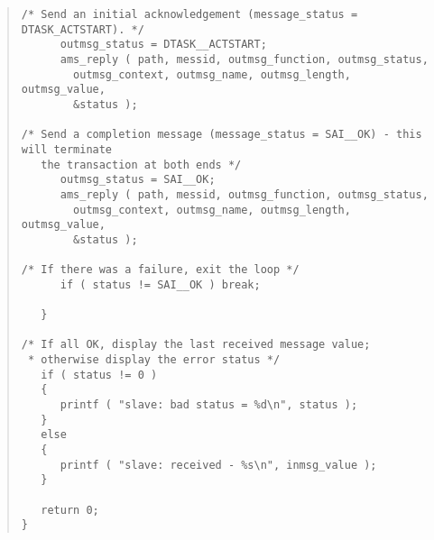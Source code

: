 \documentclass[twoside,11pt]{article}
\renewcommand{\_}{\texttt{\symbol{95}}}
\begin{document}
\begin{small}
\begin{quote}
\begin{verbatim}
/* Send an initial acknowledgement (message_status = DTASK_ACTSTART). */
      outmsg_status = DTASK__ACTSTART;
      ams_reply ( path, messid, outmsg_function, outmsg_status,
        outmsg_context, outmsg_name, outmsg_length, outmsg_value,
        &status );

/* Send a completion message (message_status = SAI__OK) - this will terminate
   the transaction at both ends */
      outmsg_status = SAI__OK;
      ams_reply ( path, messid, outmsg_function, outmsg_status,
        outmsg_context, outmsg_name, outmsg_length, outmsg_value,
        &status );

/* If there was a failure, exit the loop */
      if ( status != SAI__OK ) break;

   }

/* If all OK, display the last received message value;
 * otherwise display the error status */
   if ( status != 0 )
   {
      printf ( "slave: bad status = %d\n", status );
   }
   else
   {
      printf ( "slave: received - %s\n", inmsg_value );
   }

   return 0;
}
\end{verbatim}
\end{quote}
\end{small}
\newpage
\end{document}
